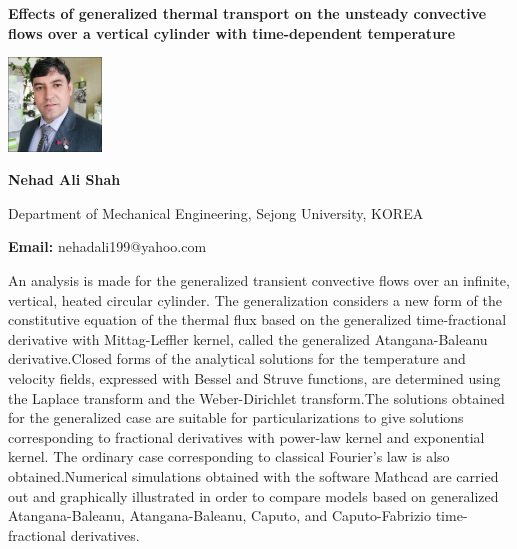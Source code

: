 \documentclass[twoside,11pt]{amsart}
\begin{document}
\vskip 10mm
\begin{center}\bf\LARGE
Effects of generalized thermal transport on the unsteady convective flows over a vertical cylinder with time-dependent temperature
\end{center}
\vskip 5mm
\begin{center}
\includegraphics[width=2.5cm, height=2.5cm, keepaspectratio=false]{NA2.jpg}
\end{center}
\vskip 2mm

\centerline{\textbf{ Nehad Ali Shah }}
\vskip 2mm
\begin{flushleft}
Department of Mechanical Engineering, Sejong University, KOREA
\end{flushleft}
\vskip 2mm
\begin{flushleft}
{\bf Email:} nehadali199@yahoo.com
\end{flushleft}

\vskip 10mm
An analysis is made for the generalized transient convective flows over an infinite, vertical, heated circular cylinder. The generalization considers a new form of the constitutive equation of the thermal flux based on the generalized time-fractional derivative with Mittag-Leffler kernel, called the generalized Atangana-Baleanu derivative.Closed forms of the analytical solutions for the temperature and velocity fields, expressed with Bessel and Struve functions, are determined using the Laplace transform and the Weber-Dirichlet transform.The solutions obtained for the generalized case are suitable for particularizations to give solutions corresponding to fractional derivatives with power-law kernel and exponential kernel. The ordinary case corresponding to classical Fourier's law is also obtained.Numerical simulations obtained with the software Mathcad are carried out and graphically illustrated in order to compare models based on generalized Atangana-Baleanu, Atangana-Baleanu, Caputo, and Caputo-Fabrizio time-fractional derivatives.
\vskip 5mm
\newpage
\end{document}
